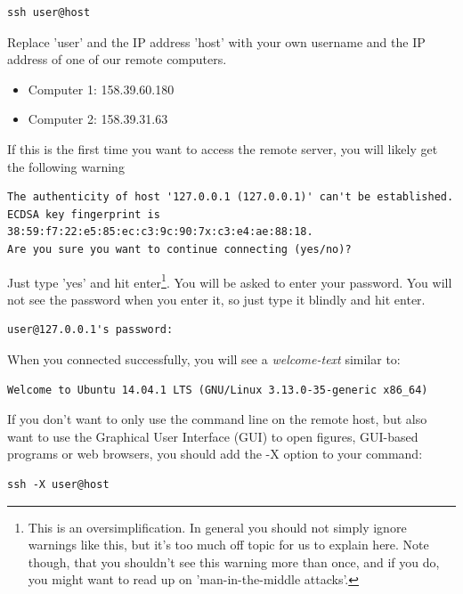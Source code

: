 \documentclass[11pt]{article}
\begin{document}
\begin{verbatim}
ssh user@host
\end{verbatim}


Replace 'user' and the IP address 'host' with your own
username and the IP address of one of our remote computers.
\begin{itemize}
\item Computer 1: 158.39.60.180
\item Computer 2: 158.39.31.63
\end{itemize}

If this is the first time you want to access the remote server, you
will likely get the following warning

\begin{verbatim}
The authenticity of host '127.0.0.1 (127.0.0.1)' can't be established.
ECDSA key fingerprint is 38:59:f7:22:e5:85:ec:c3:9c:90:7x:c3:e4:ae:88:18.
Are you sure you want to continue connecting (yes/no)?
\end{verbatim}

Just type 'yes' and hit enter\footnote{This is an oversimplification. In general you should not simply
ignore warnings like this, but it's too much off topic for us to
explain here. Note though, that you shouldn't see this warning more
than once, and if you do, you might want to read up on
'man-in-the-middle attacks'.}. You will be asked to enter your
password. You will not see the password when you enter it, so just
type it blindly and hit enter.

\begin{verbatim}
user@127.0.0.1's password:
\end{verbatim}

When you connected successfully, you will see a \emph{welcome-text} similar to:

\begin{verbatim}
Welcome to Ubuntu 14.04.1 LTS (GNU/Linux 3.13.0-35-generic x86_64)
\end{verbatim}


If you don't want to only use the command line on the remote host, but
also want to use the Graphical User Interface (GUI) to open figures,
GUI-based programs or web browsers, you should add the -X option to
your command:

\begin{verbatim}
ssh -X user@host
\end{verbatim}
\end{document}
